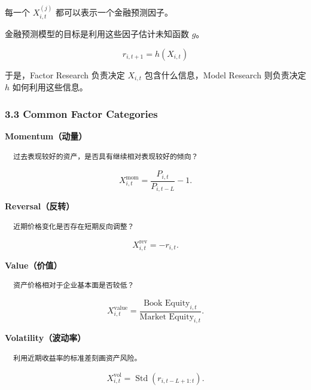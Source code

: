 每一个 \(X_{i,t}^{(j)}\) 都可以表示一个金融预测因子。

金融预测模型的目标是利用这些因子估计未知函数 \(g\)。

\[\boxed{
\hat r_{i,t+1}
=
h(X_{i,t})
}\]

于是，Factor Research 负责决定 \(X_{i,t}\) 包含什么信息，Model Research 则负责决定 \(h\) 如何利用这些信息。

\hypertarget{part-4-63-0001-common-factor-categories}{%
\subsubsection{3.3 Common Factor Categories}\label{part-4-63-0001-common-factor-categories}}


\textbf{Momentum（动量）}

\begin{verbatim}
  过去表现较好的资产，是否具有继续相对表现较好的倾向？
\end{verbatim}

\[X_{i,t}^{\mathrm{mom}}=\frac{P_{i,t}}{P_{i,t-L}}-1.\]


\textbf{Reversal（反转）}

\begin{verbatim}
  近期价格变化是否存在短期反向调整？
\end{verbatim}

\[X_{i,t}^{\mathrm{rev}}
      =-r_{i,t}.\]


\textbf{Value（价值）}

\begin{verbatim}
  资产价格相对于企业基本面是否较低？
\end{verbatim}

\[X_{i,t}^{\mathrm{value}}
      =
      \frac{\text{Book Equity}_{i,t}}
      {\text{Market Equity}_{i,t}}.\]


\textbf{Volatility（波动率）}

\begin{verbatim}
  利用近期收益率的标准差刻画资产风险。
\end{verbatim}

\[X_{i,t}^{\mathrm{vol}}
      =
      \operatorname{Std}(r_{i,t-L+1:t}).\]

